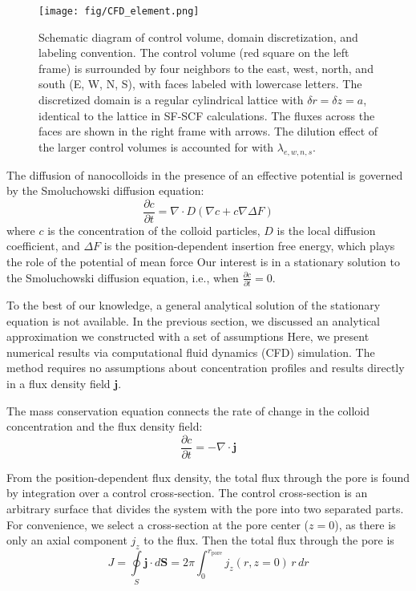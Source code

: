 \documentclass[10pt, a4paper]{article}
\begin{document}
\begin{multicols}{2}
\begin{figure}[H]
    \centering
    \texttt{[image: fig/CFD\_element.png]}
    \caption{
        Schematic diagram of control volume, domain discretization, and labeling convention.
        The control volume (red square on the left frame) is surrounded by four neighbors to the east, west, north, and south (E, W, N, S), with faces labeled with lowercase letters.
        The discretized domain is a regular cylindrical lattice with $\delta r = \delta z = a$, identical to the lattice in SF-SCF calculations.
        The fluxes across the faces are shown in the right frame with arrows.
        The dilution effect of the larger control volumes is accounted for with $\lambda_{e,w,n,s}$.
        }
    \label{fig:CFD_element}
\end{figure}

The diffusion of nanocolloids in the presence of an effective potential is governed by the Smoluchowski diffusion equation:
\begin{equation}
    \label{eq:Smoluchowski}
    \frac{\partial c}{\partial t} = \nabla \cdot D(\nabla c + c \nabla \Delta F)
\end{equation}
where $c$ is the concentration of the colloid particles, $D$ is the local diffusion coefficient, and $\Delta F$ is the position-dependent insertion free energy, which plays the role of the potential of mean force
Our interest is in a stationary solution to the Smoluchowski diffusion equation, i.e., when $\frac{\partial c}{\partial t} = 0$.

To the best of our knowledge, a general analytical solution of the stationary equation is not available.
In the previous section, we discussed an analytical approximation we constructed with a set of assumptions
Here, we present numerical results via computational fluid dynamics (CFD) simulation.
The method requires no assumptions about concentration profiles and results directly in a flux density field $\mathbf{j}$.

The mass conservation equation connects the rate of change in the colloid concentration and the flux density field:
\begin{equation}
    \frac{\partial c}{\partial t} = -\nabla \cdot \mathbf{j}
\end{equation}

From the position-dependent flux density, the total flux through the pore is found by integration over a control cross-section.
The control cross-section is an arbitrary surface that divides the system with the pore into two separated parts.
For convenience, we select a cross-section at the pore center ($z = 0$), as there is only an axial component $j_z$ to the flux.
Then the total flux through the pore is
\begin{equation}
    \label{eq:total_flux_1}
    J = \oint\limits_{S} \mathbf{j} \cdot d\mathbf{S} = 2 \pi \int_0^{r_\textrm{pore}} j_z(r, z = 0) \, r \, dr
\end{equation}


\end{multicols}
\end{document}
